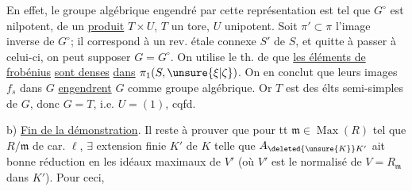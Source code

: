 En effet, le groupe algébrique  engendré par cette représentation est tel que $G^\circ$ est nilpotent,   de  un \uline{produit}  $T\times U$, $T$ un tore, $U$ unipotent.  Soit $\pi'\subset\pi$ l'image inverse de $G^\circ$; il correspond à un rev.  étale connexe $S'$ de $S$, et quitte à passer à celui-ci, on peut supposer $G=G^\circ$. On utilise le th. de \uline{} que \uline{les éléments de frobénius} \uline{sont denses} \uline{dans} $\pi_1(S,\unsure{\xi|\zeta})$. On en conclut que leurs images $f_s$ dans $G$ \uline{engendrent} $G$ comme groupe algébrique. Or $T$ est  des élts semi-simples de $G$, donc $G=T$, i.e. $U=(1)$, cqfd.

b) \uline{Fin de la démonstration}. Il reste à prouver que  pour tt $\mathfrak m\in\operatorname{Max}(R)$ tel que $R/\mathfrak m$ de car. $\ell$, $\exists$ extension finie $K'$ de $K$ telle que $A_{\deleted{\unsure{K}}K'}$ ait bonne réduction en les idéaux maximaux de $V'$ (où $V'$ est le normalisé de $V=R_{\mathfrak m}$ dans $K'$). Pour ceci, 

